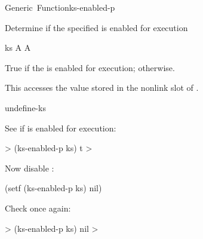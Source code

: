 \documentclass[10pt,twoside,english,pdftex]{article}
\begin{document}
\begin{functiondoc}{Generic~Function}{ks-enabled-p}{ 
    }
%

\fnsyntax

\fnpurpose Determine if the specified  is enabled for
execution

\fnsetf
{}

\fnmethods
{}

\fnpackage {}

\fnmodule {}

\fnargs
\begin{args}{ks}
\arg[ks] A 
\arg[boolean] A 
\end{args}

\fnreturns True if the  is enabled for execution; \nil{} otherwise.
  
\fndescription 
This  accesses the value stored in the 
 nonlink slot of .

\begin{alsos}{undefine-ks}
\also[define-ks]
\also[ks]
\also[undefine-ks]
\end{alsos}

\fnexamples
See if   is enabled for execution:
%
\W\supp
\begin{example}
  > (ks-enabled-p ks)
  t
  >
\end{example}
%
Now disable  :
%
\W\supp\notpretop
\begin{example}
  (setf (ks-enabled-p ks) nil)
\end{example}
%
Check once again:
%
\W\supp\notpretop
\begin{example}
  > (ks-enabled-p ks)
  nil
  >
\end{example}

\end{functiondoc}

\end{document}
